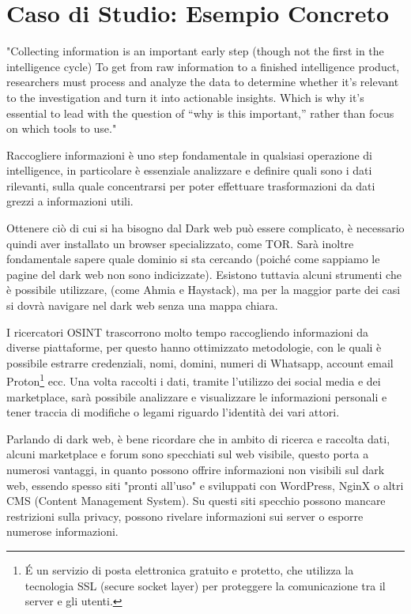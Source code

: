 \chapter{Caso di Studio: Esempio Concreto}\label{chapter:Caso_Di_Studio}

"Collecting information is an important early step (though not the first in the intelligence cycle) To get from raw information to a finished intelligence product, researchers must process and analyze the data to determine whether it’s relevant to the investigation and turn it into actionable insights. Which is why it’s essential to lead with the question of “why is this important,” rather than focus on which tools to use." \cite{caso1}

Raccogliere informazioni è uno step fondamentale in qualsiasi operazione di intelligence, in particolare è essenziale analizzare e definire quali sono i dati rilevanti, sulla quale concentrarsi per poter effettuare trasformazioni da dati grezzi a informazioni utili.

Ottenere ciò di cui si ha bisogno dal Dark web può essere complicato, è necessario quindi aver installato un browser specializzato, come TOR. Sarà inoltre fondamentale sapere quale dominio si sta cercando (poiché come sappiamo le pagine del dark web non sono indicizzate).
Esistono tuttavia alcuni strumenti che è possibile utilizzare, (come Ahmia e Haystack), ma per la maggior parte dei casi si dovrà navigare nel dark web senza una mappa chiara.

I ricercatori OSINT trascorrono molto tempo raccogliendo informazioni da diverse piattaforme, per questo hanno ottimizzato metodologie, con le quali è possibile estrarre credenziali, nomi, domini, numeri di Whatsapp, account email Proton\footnote{\'E un servizio di posta elettronica gratuito e protetto, che utilizza la tecnologia SSL (secure socket layer) per proteggere la comunicazione tra il server e gli utenti.} ecc. 
Una volta raccolti i dati, tramite l'utilizzo dei social media e dei marketplace, sarà possibile analizzare e visualizzare le informazioni personali e tener traccia di modifiche o legami riguardo l'identità dei vari attori.

Parlando di dark web, è bene ricordare che in ambito di ricerca e raccolta dati, alcuni marketplace e forum sono specchiati sul web visibile, questo porta a numerosi vantaggi, in quanto possono offrire informazioni non visibili sul dark web, essendo spesso siti "pronti all'uso" e sviluppati con WordPress, NginX o altri CMS (Content Management System). Su questi siti specchio possono mancare restrizioni sulla privacy, possono rivelare informazioni sui server o esporre numerose informazioni.


